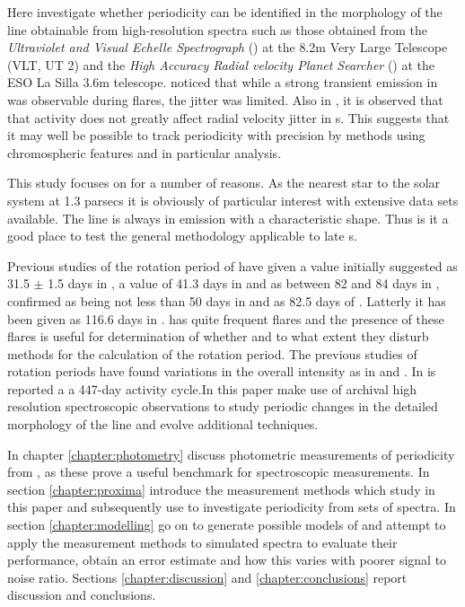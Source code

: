 Here {\Firstp} investigate whether periodicity can be identified in the morphology of the {\ha} line obtainable from
high-resolution spectra such as those obtained from the \textit{Ultraviolet and Visual Echelle Spectrograph} ({\uves})
at the 8.2m Very Large Telescope (VLT, UT 2) and the \textit{High Accuracy Radial velocity Planet Searcher} ({\harps})
at the ESO La Silla 3.6m telescope.  \citet{barnes14} noticed that while a strong transient emission in {\ha} was
observable during flares, the jitter was limited. Also in \citet{reiners09}, it is observed that that activity does not
greatly affect radial velocity jitter in \rdwarf s. This suggests that it may well be possible to track periodicity with
precision by methods using chromospheric features and in particular {\ha} analysis.

This study focuses on {\prox} for a number of reasons. As the nearest star to the solar system at 1.3 parsecs it is
obviously of particular interest with extensive data sets available. The {\ha} line is always in emission with a
characteristic shape. Thus is it a good place to test the general methodology applicable to late \rdwarf s.

Previous studies of the rotation period of {\prox} have given a value initially suggested as 31.5 $\pm$ 1.5 days in
\citet{guinan96}, a value of 41.3 days in \citet{benedict93} and as between 82 and 84 days in
\citealt{benedict92,benedict98}, confirmed as being not less than 50 days in \citet{kurster99} and as 82.5 days of
\citet{kiraga07}. Latterly it has been given as 116.6 days in \citet[Table 3]{suarezmascareno15}.  {\prox} has quite
frequent flares and the presence of these flares is useful for determination of whether and to what extent they disturb
methods for the calculation of the rotation period. The previous studies of rotation periods have found variations in
the overall intensity as in \citet{benedict98} and \citet{kiraga07}. In \citet{cincunegui07} is reported a a 447-day
activity cycle.In this paper {\Firstp} make use of archival high resolution spectroscopic observations to study periodic
changes in the detailed morphology of the {\ha} line and evolve additional techniques.

In chapter \ref{chapter:photometry} {\Firstp} discuss photometric measurements of periodicity from \prox, as these prove a
useful benchmark for spectroscopic measurements. In section \ref{chapter:proxima} {\Firstp} introduce the measurement
methods which {\Firstp} study in this paper and subsequently use to investigate periodicity from sets of spectra. In
section \ref{chapter:modelling} {\Firstp} go on to generate possible models of {\prox} and attempt to apply the
measurement methods to simulated spectra to evaluate their performance, obtain an error estimate and how this varies
with poorer signal to noise ratio. Sections \ref{chapter:discussion} and \ref{chapter:conclusions} report {\Firstposs}
discussion and conclusions.

